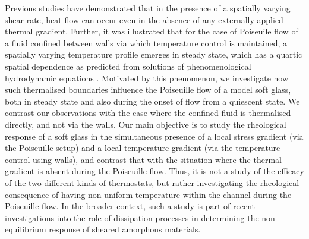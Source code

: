 Previous studies \cite{baranyai1992isothermal} have demonstrated that in the presence of a spatially varying shear-rate, heat flow can occur even in the absence of any externally applied thermal gradient. Further, it was illustrated that for the case of Poiseuile flow of a fluid confined between walls via which temperature control is maintained, a spatially varying temperature profile emerges in steady state, which has a quartic spatial dependence as predicted from solutions of phenomenological hydrodynamic equations \cite{todd1995, varnik2002, binder2004molecular}. Motivated by this phenomenon, we investigate how such thermalised boundaries influence the Poiseuille flow of a model soft glass, both in steady state and also during the onset of flow from a quiescent state. We contrast our observations with the case where the confined fluid is thermalised directly, and not via the walls. Our main objective is to study the rheological response of a soft glass in the simultaneous presence of a local stress gradient (via the Poiseuille setup) and a local temperature gradient (via the temperature control using walls), and contrast that with the situation where the thermal gradient is absent during the Poiseuille flow. Thus, it is not a study of the efficacy of the two different kinds of thermostats, but rather investigating the rheological consequence of having non-uniform temperature within the channel during the Poiseuille flow. In the broader context, such a study is part of recent investigations into the role of dissipation processes \cite{nicolas2016effects, irani2019discontinuous, vasisht2018permanent} in determining the non-equilibrium response of sheared amorphous materials. 


